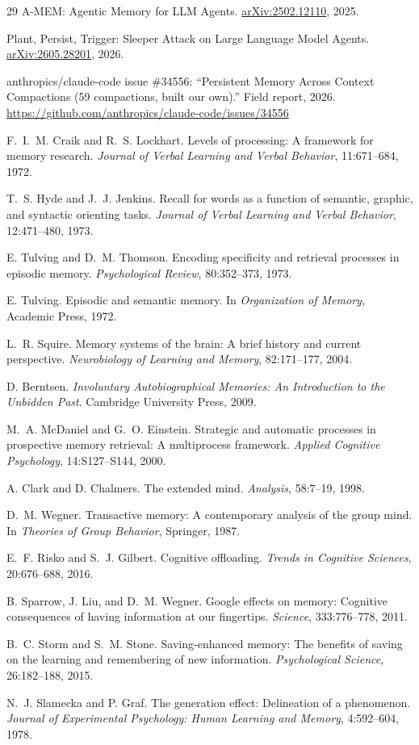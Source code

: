 \documentclass[11pt]{article}
\begin{document}
\begin{thebibliography}{29}
 A-MEM: Agentic Memory for LLM Agents. \href{https://arxiv.org/abs/2502.12110}{arXiv:2502.12110}, 2025.

 Plant, Persist, Trigger: Sleeper Attack on Large Language Model Agents. \href{https://arxiv.org/abs/2605.28201}{arXiv:2605.28201}, 2026.

 anthropics/claude-code issue \#34556: ``Persistent Memory Across Context Compactions (59 compactions, built our own).'' Field report, 2026. \url{https://github.com/anthropics/claude-code/issues/34556}

 F.~I.~M. Craik and R.~S. Lockhart. Levels of processing: A framework for memory research. \emph{Journal of Verbal Learning and Verbal Behavior}, 11:671--684, 1972.

 T.~S. Hyde and J.~J. Jenkins. Recall for words as a function of semantic, graphic, and syntactic orienting tasks. \emph{Journal of Verbal Learning and Verbal Behavior}, 12:471--480, 1973.

 E. Tulving and D.~M. Thomson. Encoding specificity and retrieval processes in episodic memory. \emph{Psychological Review}, 80:352--373, 1973.

 E. Tulving. Episodic and semantic memory. In \emph{Organization of Memory}, Academic Press, 1972.

 L.~R. Squire. Memory systems of the brain: A brief history and current perspective. \emph{Neurobiology of Learning and Memory}, 82:171--177, 2004.

 D. Berntsen. \emph{Involuntary Autobiographical Memories: An Introduction to the Unbidden Past}. Cambridge University Press, 2009.

 M.~A. McDaniel and G.~O. Einstein. Strategic and automatic processes in prospective memory retrieval: A multiprocess framework. \emph{Applied Cognitive Psychology}, 14:S127--S144, 2000.

 A. Clark and D. Chalmers. The extended mind. \emph{Analysis}, 58:7--19, 1998.

 D.~M. Wegner. Transactive memory: A contemporary analysis of the group mind. In \emph{Theories of Group Behavior}, Springer, 1987.

 E.~F. Risko and S.~J. Gilbert. Cognitive offloading. \emph{Trends in Cognitive Sciences}, 20:676--688, 2016.

 B. Sparrow, J. Liu, and D.~M. Wegner. Google effects on memory: Cognitive consequences of having information at our fingertips. \emph{Science}, 333:776--778, 2011.

 B.~C. Storm and S.~M. Stone. Saving-enhanced memory: The benefits of saving on the learning and remembering of new information. \emph{Psychological Science}, 26:182--188, 2015.

 N.~J. Slamecka and P. Graf. The generation effect: Delineation of a phenomenon. \emph{Journal of Experimental Psychology: Human Learning and Memory}, 4:592--604, 1978.

\end{thebibliography}
\end{document}
